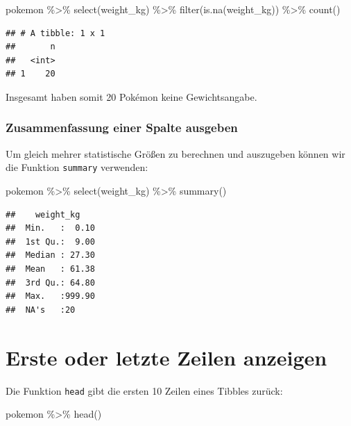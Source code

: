 \documentclass[
]{book}
\newenvironment{Shaded}{\begin{snugshade}}{\end{snugshade}}
\newcommand{\FunctionTok}[1]{\textcolor[rgb]{0.00,0.00,0.00}{#1}}
\newcommand{\NormalTok}[1]{#1}
\newcommand{\SpecialCharTok}[1]{\textcolor[rgb]{0.00,0.00,0.00}{#1}}
\begin{document}
\begin{Shaded}
\begin{Highlighting}[]
\NormalTok{pokemon }\SpecialCharTok{\%\textgreater{}\%}
  \FunctionTok{select}\NormalTok{(weight\_kg) }\SpecialCharTok{\%\textgreater{}\%}
  \FunctionTok{filter}\NormalTok{(}\FunctionTok{is.na}\NormalTok{(weight\_kg)) }\SpecialCharTok{\%\textgreater{}\%}
  \FunctionTok{count}\NormalTok{()}
\end{Highlighting}
\end{Shaded}

\begin{verbatim}
## # A tibble: 1 x 1
##       n
##   <int>
## 1    20
\end{verbatim}

Insgesamt haben somit 20 Pokémon keine Gewichtsangabe.

\hypertarget{zusammenfassung-einer-spalte-ausgeben}{%
\subsubsection{Zusammenfassung einer Spalte ausgeben}\label{zusammenfassung-einer-spalte-ausgeben}}

Um gleich mehrer statistische Größen zu berechnen und auszugeben können wir die Funktion \texttt{summary} verwenden:

\begin{Shaded}
\begin{Highlighting}[]
\NormalTok{pokemon }\SpecialCharTok{\%\textgreater{}\%}
  \FunctionTok{select}\NormalTok{(weight\_kg) }\SpecialCharTok{\%\textgreater{}\%}
  \FunctionTok{summary}\NormalTok{()}
\end{Highlighting}
\end{Shaded}

\begin{verbatim}
##    weight_kg     
##  Min.   :  0.10  
##  1st Qu.:  9.00  
##  Median : 27.30  
##  Mean   : 61.38  
##  3rd Qu.: 64.80  
##  Max.   :999.90  
##  NA's   :20
\end{verbatim}

\hypertarget{erste-oder-letzte-zeilen-anzeigen}{%
\section{Erste oder letzte Zeilen anzeigen}\label{erste-oder-letzte-zeilen-anzeigen}}

Die Funktion \texttt{head} gibt die ersten 10 Zeilen eines Tibbles zurück:

\begin{Shaded}
\begin{Highlighting}[]
\NormalTok{pokemon }\SpecialCharTok{\%\textgreater{}\%}
  \FunctionTok{head}\NormalTok{()}
\end{Highlighting}
\end{Shaded}
\end{document}
